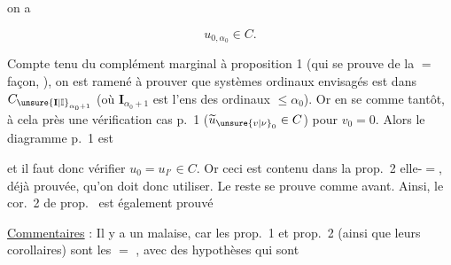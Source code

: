 
on a

\[
 u_{0,\alpha_0}\in C.
\]

Compte tenu du complément marginal à proposition 1 (qui se prouve de la $=$ façon, \unsure{\ldots}), on est ramené à prouver que   systèmes ordinaux envisagés est dans $C_{\unsure{\mathbf I|\mathbb I}_{\alpha_0+1}}$  (où $\mathbf I_{\alpha_0+1}$ est l’ens des ordinaux $\leq\alpha_0$). Or  en  se   comme tantôt, à cela près    une vérification  cas p.~1 ($\widetilde u_{\unsure{v|\nu}_0}\in C$) pour $v_0=0$. Alors le diagramme  p.~1 est


et il faut donc vérifier $u_0=u_{I'}\in C$. Or ceci est contenu dans la prop.~2 elle-$=$, déjà prouvée, qu’on doit donc utiliser. Le reste se prouve comme avant. Ainsi, le cor.~2 de prop.~ est également prouvé

\uline{Commentaires} : Il y a un malaise, car les prop.~1 et prop.~2  (ainsi que leurs corollaires) sont  les $=$ , avec des hypothèses  qui sont

